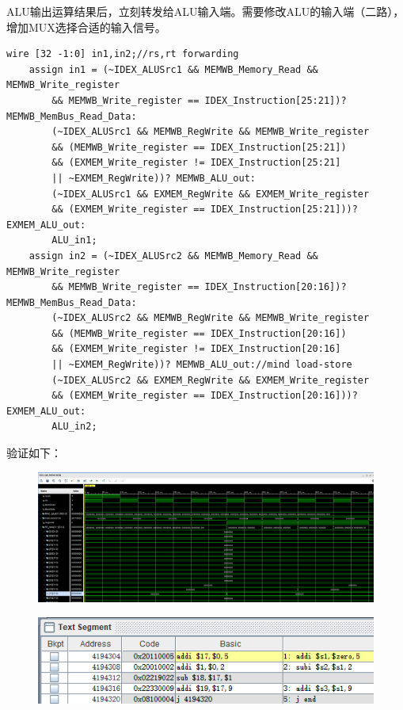 \documentclass[10pt]{article}
\begin{document}
ALU输出运算结果后，立刻转发给ALU输入端。需要修改ALU的输入端（二路），增加MUX选择合适的输入信号。
\begin{lstlisting}[style={verilog-style}]
    wire [32 -1:0] in1,in2;//rs,rt forwarding
    assign in1 = (~IDEX_ALUSrc1 && MEMWB_Memory_Read && MEMWB_Write_register 
        && MEMWB_Write_register == IDEX_Instruction[25:21])? MEMWB_MemBus_Read_Data:
        (~IDEX_ALUSrc1 && MEMWB_RegWrite && MEMWB_Write_register 
        && (MEMWB_Write_register == IDEX_Instruction[25:21])
        && (EXMEM_Write_register != IDEX_Instruction[25:21] 
        || ~EXMEM_RegWrite))? MEMWB_ALU_out:
        (~IDEX_ALUSrc1 && EXMEM_RegWrite && EXMEM_Write_register
        && (EXMEM_Write_register == IDEX_Instruction[25:21]))? EXMEM_ALU_out: 
        ALU_in1;
    assign in2 = (~IDEX_ALUSrc2 && MEMWB_Memory_Read && MEMWB_Write_register 
        && MEMWB_Write_register == IDEX_Instruction[20:16])? MEMWB_MemBus_Read_Data:
        (~IDEX_ALUSrc2 && MEMWB_RegWrite && MEMWB_Write_register 
        && (MEMWB_Write_register == IDEX_Instruction[20:16])
        && (EXMEM_Write_register != IDEX_Instruction[20:16] 
        || ~EXMEM_RegWrite))? MEMWB_ALU_out://mind load-store
        (~IDEX_ALUSrc2 && EXMEM_RegWrite && EXMEM_Write_register
        && (EXMEM_Write_register == IDEX_Instruction[20:16]))? EXMEM_ALU_out: 
        ALU_in2;
\end{lstlisting}
验证如下：
\begin{figure}[H]
    \centering
    \includegraphics[scale=0.35]{haddaz.png}
    \end{figure}
    \begin{figure}[H]
        \centering
        \includegraphics[scale=0.9]{hadd.png}
        \end{figure}
\end{document}
